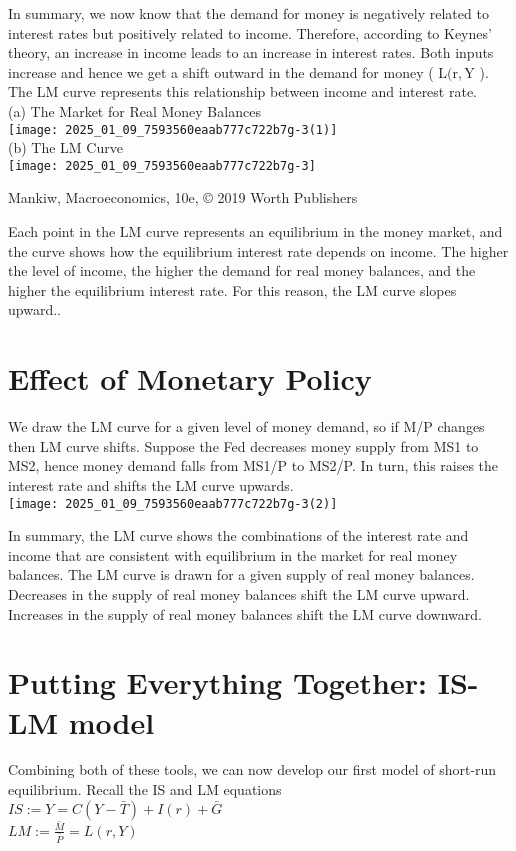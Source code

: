 \documentclass[10pt]{article}
\begin{document}
In summary, we now know that the demand for money is negatively related to interest rates but positively related to income. Therefore, according to Keynes' theory, an increase in income leads to an increase in interest rates. Both inputs increase and hence we get a shift outward in the demand for money ( $\mathrm{L}(\mathrm{r}, \mathrm{Y}$ ). The LM curve represents this relationship between income and interest rate.\\
(a) The Market for Real Money Balances\\
\texttt{[image: 2025\_01\_09\_7593560eaab777c722b7g-3(1)]}\\
(b) The LM Curve\\
\texttt{[image: 2025\_01\_09\_7593560eaab777c722b7g-3]}

Mankiw, Macroeconomics, 10e, © 2019 Worth Publishers

Each point in the LM curve represents an equilibrium in the money market, and the curve shows how the equilibrium interest rate depends on income. The higher the level of income, the higher the demand for real money balances, and the higher the equilibrium interest rate. For this reason, the LM curve slopes upward..

\section*{Effect of Monetary Policy}
We draw the LM curve for a given level of money demand, so if M/P changes then LM curve shifts. Suppose the Fed decreases money supply from MS1 to MS2, hence money demand falls from MS1/P to MS2/P. In turn, this raises the interest rate and shifts the LM curve upwards.\\
\texttt{[image: 2025\_01\_09\_7593560eaab777c722b7g-3(2)]}

In summary, the LM curve shows the combinations of the interest rate and income that are consistent with equilibrium in the market for real money balances. The LM curve is drawn for a given supply of real money balances. Decreases in the supply of real money balances shift the LM curve upward. Increases in the supply of real money balances shift the LM curve downward.

\section*{Putting Everything Together: IS-LM model}
Combining both of these tools, we can now develop our first model of short-run equilibrium. Recall the IS and LM equations\\
$I S:=Y=C(Y-\bar{T})+I(r)+\bar{G}$\\
$L M:=\frac{\bar{M}}{\bar{P}}=L(r, Y)$
\end{document}

